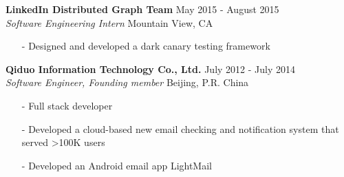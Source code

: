 \documentclass[mm, 7pt]{resume} %
\begin{document}
\begin{resume}
\textbf{LinkedIn Distributed Graph Team} \hfill May 2015 - August 2015 \\
{\sl Software Engineering Intern}  \hfill Mountain View, CA
\begin{itemize} \itemsep -2pt
\item[-] Designed and developed a dark canary testing framework
\end{itemize}

\textbf{Qiduo Information Technology Co., Ltd.}  \hfill  July 2012 - July 2014 \\
{\sl Software Engineer, Founding member}                          \hfill  Beijing, P.R. China
\begin{itemize} \itemsep -2pt
\item[-] Full stack developer
\item[-] Developed a cloud-based new email checking and notification system that served >100K users
\item[-] Developed an Android email app LightMail
\end{itemize}



\end{resume}
\end{document}
